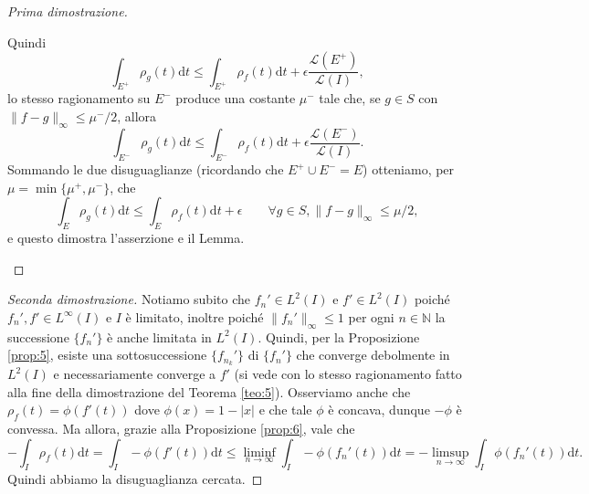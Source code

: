 \documentclass[a4paper,11pt]{book}
\theoremstyle{plain}
\theoremstyle{definition}
\theoremstyle{remark}
\newcommand{\N}{\mathbb{N}}
\newcommand{\LL}{\mathscr{L}}
\newcommand{\norm}[1]{\lVert#1\rVert}
\newcommand{\dt}{\text{d}t}
\newcommand{\diff}{\text{d}}
\begin{document}
\begin{proof}[Prima dimostrazione]
\begin{description}
		Quindi
		\[
			\int_{E^+}\rho_g(t)\diff t\leq \int_{E^+}\rho_f(t)\diff t+\epsilon\frac{\LL(E^+)}{\LL(I)},
		\]
		lo stesso ragionamento su $E^-$ produce una costante $\mu^-$ tale che, se $g\in S$ con $\norm{f-g}_{\infty}\leq \mu^-/2$, allora
		\[
			\int_{E^-}\rho_g(t)\diff t\leq \int_{E^-}\rho_f(t)\diff t+\epsilon\frac{\LL(E^-)}{\LL(I)}.
		\]
		Sommando le due disuguaglianze (ricordando che $E^+\cup E^-=E$) otteniamo, per $\mu=\min\{\mu^+,\mu^-\}$, che
		\[
			\int_E\rho_g(t)\diff t\leq \int_E\rho_f(t)\diff t+\epsilon\qquad \forall g\in S, \norm{f-g}_{\infty}\leq \mu/2,
		\]
		e questo dimostra l'asserzione e il Lemma.
	\end{description}
\end{proof}
\begin{proof}[Seconda dimostrazione]
	Notiamo subito che $f_{n}'\in L^{2}(I)$ e $f'\in L^{2}(I)$ poiché $f_{n}',f'\in L^{\infty}(I)$ e $I$ è limitato, inoltre poiché $\norm{f_{n}'}_{\infty}\leq 1$ per ogni $n\in\N$ la successione $\{f_{n}'\}$ è anche limitata in $L^{2}(I)$. Quindi, per la Proposizione \ref{prop:5}, esiste una sottosuccessione $\{f_{n_{k}}'\}$ di $\{f_{n}'\}$ che converge debolmente in $L^{2}(I)$ e necessariamente converge a $f'$ (si vede con lo stesso ragionamento fatto alla fine della dimostrazione del Teorema \ref{teo:5}). Osserviamo anche che $\rho_{f}(t) = \phi(f'(t))$ dove $\phi(x) = 1-|x|$ e che tale $\phi$ è concava, dunque $-\phi$ è convessa. Ma allora, grazie alla Proposizione \ref{prop:6}, vale che
	\[
		-\int_{I}\rho_{f}(t)\dt=\int_{I}-\phi(f'(t))\dt\leq \liminf_{n\to\infty}\int_{I}-\phi(f_{n}'(t))\dt = -\limsup_{n\to\infty}\int_{I}\phi(f_{n}'(t))\dt.
	\]
	Quindi abbiamo la disuguaglianza cercata.
\end{proof}
\end{document}
